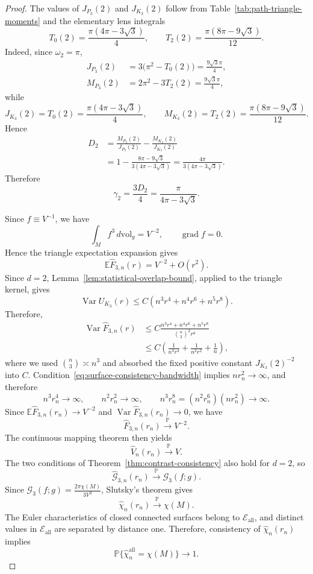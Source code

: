 \documentclass[11pt]{article}
\theoremstyle{remark}
\newcommand{\grad}{\operatorname{grad}}
\newcommand{\E}{\mathbb E}
\newcommand{\Pp}{\mathbb P}
\numberwithin{equation}{section}
\begin{document}
\begin{proof}
The values of $J_{P_3}(2)$ and $J_{K_3}(2)$ follow from
Table~\ref{tab:path-triangle-moments} and the elementary lens integrals
\[
T_0(2)=\frac{\pi(4\pi-3\sqrt3)}4,
\qquad
T_2(2)=\frac{\pi(8\pi-9\sqrt3)}{12}.
\]
Indeed, since $\omega_2=\pi$,
\[
\begin{aligned}
J_{P_3}(2)
&=
3\bigl(\pi^2-T_0(2)\bigr)
=
\frac{9\sqrt3\pi}{4},\\
M_{P_3}(2)
&=
2\pi^2-3T_2(2)
=
\frac{9\sqrt3\pi}{4},
\end{aligned}
\]
while
\[
J_{K_3}(2)=T_0(2)
=
\frac{\pi(4\pi-3\sqrt3)}4,
\qquad
M_{K_3}(2)=T_2(2)
=
\frac{\pi(8\pi-9\sqrt3)}{12}.
\]
Hence
\[
\begin{aligned}
D_2
&=
\frac{M_{P_3}(2)}{J_{P_3}(2)}
-
\frac{M_{K_3}(2)}{J_{K_3}(2)}\\
&=
1-
\frac{8\pi-9\sqrt3}{3(4\pi-3\sqrt3)}
=
\frac{4\pi}{3(4\pi-3\sqrt3)}.
\end{aligned}
\]
Therefore
\[
\gamma_2
=
\frac{3D_2}{4}
=
\frac{\pi}{4\pi-3\sqrt3}.
\]

Since $f\equiv V^{-1}$, we have
\[
\int_M f^3\,d\mathrm{vol}_g=V^{-2},
\qquad
\grad f=0.
\]
Hence the triangle expectation expansion gives
\[
\E\widehat F_{3,n}(r)=V^{-2}+O(r^2).
\]
Since $d=2$, Lemma~\ref{lem:statistical-overlap-bound},
applied to the triangle kernel, gives
\[
\operatorname{Var}U_{K_3}(r)
\le
C\left(
n^3r^4+n^4r^6+n^5r^8
\right).
\]
Therefore,
\[
\begin{aligned}
\operatorname{Var}\widehat F_{3,n}(r)
&\le
C\frac{
n^3r^4+n^4r^6+n^5r^8
}{
\binom n3^2r^8
}\\
&\le
C\left(
\frac1{n^3r^4}
+\frac1{n^2r^2}
+\frac1n
\right),
\end{aligned}
\]
where we used $\binom n3\asymp n^3$ and absorbed the fixed positive
constant $J_{K_3}(2)^{-2}$ into $C$.
Condition~\eqref{eq:surface-consistency-bandwidth} implies
$n r_n^2\to\infty$, and therefore
\[
n^3r_n^4\to\infty,
\qquad
n^2r_n^2\to\infty,
\qquad
n^3r_n^8
=
(n^2r_n^6)(n r_n^2)
\to\infty.
\]
Since $\E\widehat F_{3,n}(r_n)\to V^{-2}$ and $\operatorname{Var}\widehat F_{3,n}(r_n)\to0$,
we have
\[
\widehat F_{3,n}(r_n)\xrightarrow{\Pp}V^{-2}.
\]
The continuous mapping theorem then yields
\[
\widehat V_n(r_n)\xrightarrow{\Pp}V.
\]
The two conditions of Theorem~\ref{thm:contrast-consistency} also hold for
$d=2$, so
\[
\widehat{\mathcal G}_{3,n}(r_n)
\xrightarrow{\Pp}
\mathcal G_3(f;g).
\]
Since $\mathcal G_3(f;g)
=
\frac{2\pi\chi(M)}{3V^3}$,
Slutsky's theorem gives
\[
\widehat\chi_n(r_n)
\xrightarrow{\Pp}
\chi(M).
\]
The Euler characteristics of closed connected surfaces belong to
$\mathcal E_{\mathrm{all}}$, and distinct values in
$\mathcal E_{\mathrm{all}}$ are separated by distance one.  Therefore,
consistency of $\widehat\chi_n(r_n)$ implies
\[
\Pp\{
\widehat\chi_n^{\mathrm{all}}=\chi(M)
\}
\longrightarrow1.
\]
\end{proof}
\end{document}
